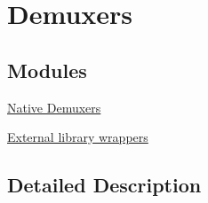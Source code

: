 \hypertarget{group__lavf__codec}{}\section{Demuxers}
\label{group__lavf__codec}
\subsection*{Modules}
\begin{DoxyCompactItemize}
\item 
\hyperlink{group__lavf__codec__native}{Native Demuxers}
\item 
\hyperlink{group__lavf__codec__wrappers}{External library wrappers}
\end{DoxyCompactItemize}


\subsection{Detailed Description}
